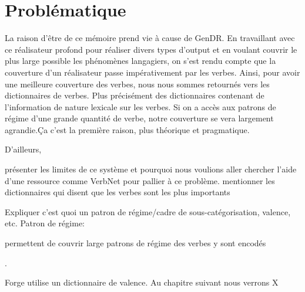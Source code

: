 
\section{Problématique}\label{problema}
La raison d'être de ce mémoire prend vie à cause de GenDR. En travaillant avec ce réalisateur profond pour réaliser divers types d'output et en voulant couvrir le plus large possible les phénomènes langagiers, on s'est rendu compte que la couverture d'un réalisateur passe impérativement par les verbes. Ainsi, pour avoir une meilleure couverture des verbes, nous nous sommes retournés vers les dictionnaires de verbes. Plus précisément des dictionnaires contenant de l'information de nature lexicale sur les verbes. Si on a accès aux patrons de régime d'une grande quantité de verbe, notre couverture se vera largement agrandie.Ça c'est la première raison, plus théorique et pragmatique. 

D'ailleurs, 

présenter les limites de ce système et pourquoi nous voulions aller chercher l'aide d'une ressource comme VerbNet pour pallier à ce problème.
mentionner les dictionnaires qui disent que les verbes sont les plus importants

Expliquer c'est quoi un patron de régime/cadre de sous-catégorisation, valence, etc. \citep{MilicevicSchemaregimepont2009}
Patron de régime:

permettent de couvrir large
patrons de régime des verbes y sont encodés

.

Forge utilise un dictionnaire de valence.
Au chapitre suivant nous verrons X